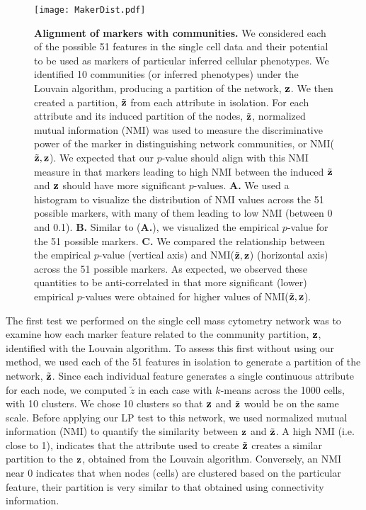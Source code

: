 \begin{figure}
\centering
\begin{center}
\texttt{[image: MakerDist.pdf]}
\caption{{\bf Alignment of markers with communities.} We considered each of the possible 51 features in the single cell data and their potential to be used as markers of particular inferred cellular phenotypes. We identified 10 communities (or inferred phenotypes) under the Louvain algorithm, producing a partition of the network, ${\bf z}$. We then created a partition, $\tilde{\bf z}$ from each attribute in isolation. For each attribute and its induced partition of the nodes, $\tilde{\bf z}$, normalized mutual information (NMI) was used to measure the discriminative power of the marker in distinguishing network communities, or NMI($ \tilde{\bf z},{\bf z}$). We expected that our $p$-value should align with this NMI measure in that markers leading to high NMI between the induced $\tilde{\bf z}$ and ${\bf z}$ should have more significant $p$-values. {\bf A.} We used a histogram to visualize the distribution of NMI values across the 51 possible markers, with many of them leading to low NMI (between 0 and 0.1). {\bf B.} Similar to ({\bf A.}), we visualized the empirical $p$-value for the 51 possible markers. {\bf C.} We compared the relationship between the empirical $p$-value (vertical axis) and NMI($ \tilde{\bf z},{\bf z}$) (horizontal axis) across the 51 possible markers. As expected, we observed these quantities to be anti-correlated in that more significant (lower) empirical $p$-values were obtained for higher values of NMI($ \tilde{\bf z},{\bf z}$).}
\label{MarkerDist}
\end{center}
\end{figure}

The first test we performed on the single cell mass cytometry network was to examine how each marker feature related to the community partition, ${\bf z}$, identified with the Louvain algorithm. To assess this first without using our method, we used each of the 51 features in isolation to generate a partition of the network, $\tilde{\bf z}$. Since each individual feature generates a single continuous attribute for each node, we computed $\tilde{z}$ in each case with $k$-means across the 1000 cells, with 10 clusters. We chose 10 clusters so that ${\bf z}$ and $\tilde{\bf z}$ would be on the same scale. Before applying our LP test to this network, we used normalized mutual information (NMI) \cite{commdeccompare} to quantify the similarity between ${\bf z}$ and $\tilde{\bf z}$. A high NMI (i.e. close to 1), indicates that the attribute used to create $\tilde{\bf z}$ creates a similar partition to the ${\bf z}$, obtained from the Louvain algorithm. Conversely, an NMI near 0 indicates that when nodes (cells) are clustered based on the particular feature, their partition is very similar to that obtained using connectivity information. 

